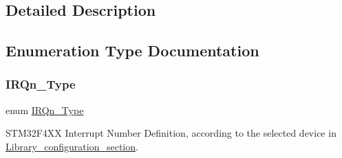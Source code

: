 \subsection{Detailed Description}


\subsection{Enumeration Type Documentation}
\mbox{\label{group___peripheral__interrupt__number__definition_ga7e1129cd8a196f4284d41db3e82ad5c8}} 
\subsubsection{\texorpdfstring{I\+R\+Qn\+\_\+\+Type}{IRQn\_Type}}
{\footnotesize\ttfamily enum \hyperlink{group___peripheral__interrupt__number__definition_ga7e1129cd8a196f4284d41db3e82ad5c8}{I\+R\+Qn\+\_\+\+Type}}



S\+T\+M32\+F4\+XX Interrupt Number Definition, according to the selected device in \hyperlink{group___library__configuration__section}{Library\+\_\+configuration\+\_\+section}. 

